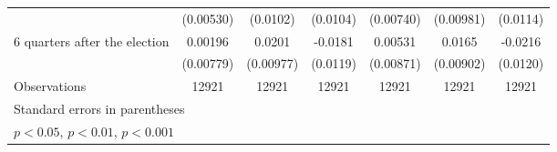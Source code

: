 \begin{table}[!ht]
\begin{tabular}{l*{6}{c}}
                    &   (0.00530)         &    (0.0102)         &    (0.0104)         &   (0.00740)         &   (0.00981)         &    (0.0114)         \\
[1em]
 6 quarters after the election&     0.00196         &      0.0201\sym{*}  &     -0.0181         &     0.00531         &      0.0165         &     -0.0216         \\
                    &   (0.00779)         &   (0.00977)         &    (0.0119)         &   (0.00871)         &   (0.00902)         &    (0.0120)         \\
\hline
Observations        &       12921         &       12921         &       12921         &       12921         &       12921         &       12921         \\
\hline\hline
\multicolumn{7}{l}{\footnotesize Standard errors in parentheses}\\
\multicolumn{7}{l}{\footnotesize \sym{*} \(p<0.05\), \sym{**} \(p<0.01\), \sym{***} \(p<0.001\)}\\
\end{tabular}
\end{table}
